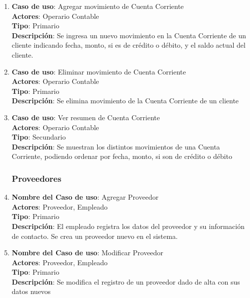 \documentclass[12pt]{extarticle}
\begin{document}
\begin{spacing}{1.2}
\begin{enumerate}
        \item 	\textbf{Caso de uso}: Agregar movimiento de Cuenta Corriente\\
                \textbf{Actores}: Operario Contable\\
                \textbf{Tipo}: Primario\\
                \textbf{Descripción}: Se ingresa un nuevo movimiento en la Cuenta Corriente de un cliente indicando fecha, monto, si es de crédito o débito, y el saldo actual del cliente.

        \item   \textbf{Caso de uso}: Eliminar movimiento de Cuenta Corriente\\
                \textbf{Actores}: Operario Contable\\
                \textbf{Tipo}: Primario\\
                \textbf{Descripción}: Se elimina movimiento de la Cuenta Corriente de un cliente

        \item   \textbf{Caso de uso}: Ver resumen de Cuenta Corriente\\
                \textbf{Actores}: Operario Contable\\
                \textbf{Tipo}: Secundario\\
                \textbf{Descripción}: Se muestran los distintos movimientos de una Cuenta Corriente, podiendo ordenar por fecha, monto, si son de crédito o débito



        \subsubsection{Proveedores}



        \item 	\textbf{Nombre del Caso de uso}: Agregar Proveedor\\
                \textbf{Actores}: Proveedor, Empleado\\
                \textbf{Tipo}: Primario\\
                \textbf{Descripción}: El empleado registra los datos del proveedor y su información de contacto. Se crea un proveedor nuevo en el sistema.
        
        \item 	\textbf{Nombre del Caso de uso}: Modificar Proveedor\\
                \textbf{Actores}: Proveedor, Empleado\\
                \textbf{Tipo}: Primario\\
                \textbf{Descripción}: Se modifica el registro de un proveedor dado de alta con sus datos nuevos
        

\end{enumerate}
\end{spacing}
\end{document}
